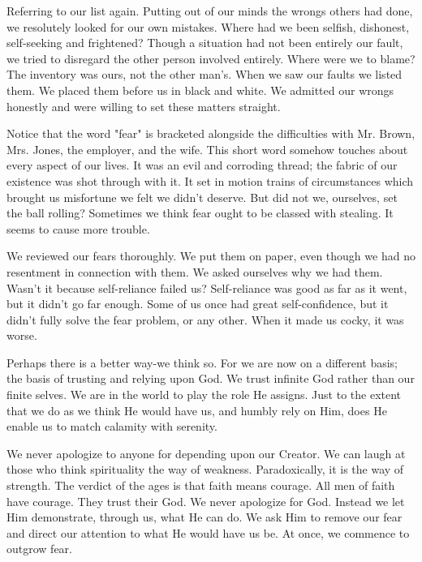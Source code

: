 \begin{biblechapter}
Referring to our list again.  Putting out of our minds the wrongs others had done, we resolutely looked for our own mistakes.  Where had we been selfish, dishonest, self-seeking and frightened?  Though a situation had not been entirely our fault, we tried to disregard the other person involved entirely.  Where were we to blame?  The inventory was ours, not the other man's.  When we saw our faults we listed them.  We placed them before us in black and white.  We admitted our wrongs honestly and were willing to set these matters straight.

Notice that the word "fear" is bracketed alongside the difficulties with Mr. Brown, Mrs. Jones, the employer, and the wife.  This short word somehow touches about every aspect of our lives.  It was an evil and corroding thread; the fabric of our existence was shot through with it.  It set in motion trains of circumstances which brought us misfortune we felt we didn't deserve.  But did not we, ourselves, set the ball rolling?  Sometimes we think fear ought to be classed with stealing.  It seems to cause more trouble.

We reviewed our fears thoroughly.  We put them on paper, even though we had no resentment in connection with them.  We asked ourselves why we had them.  Wasn't it because self-reliance failed us?  Self-reliance was good as far as it went, but it didn't go far enough.  Some of us once had great self-confidence, but it didn't fully solve the fear problem, or any other.  When it made us cocky, it was worse.

Perhaps there is a better way-we think so.  For we are now on a different basis; the basis of trusting and relying upon God.  We trust infinite God rather than our finite selves.  We are in the world to play the role He assigns.  Just to the extent that we do as we think He would have us, and humbly rely on Him, does He enable us to match calamity with serenity.

We never apologize to anyone for depending upon our Creator.  We can laugh at those who think spirituality the way of weakness.  Paradoxically, it is the way of strength.  The verdict of the ages is that faith means courage.  All men of faith have courage.  They trust their God.  We never apologize for God.  Instead we let Him demonstrate, through us, what He can do.  We ask Him to remove our fear and direct our attention to what He would have us be.  At once, we commence to outgrow fear.


\end{biblechapter}
